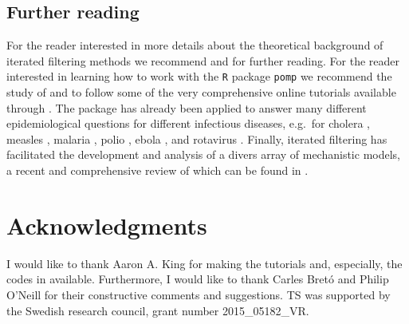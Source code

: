 \subsection{Further reading}
For the reader interested in more details about the theoretical background of iterated filtering methods we recommend  \cite{ionides06} and  \cite{Ionides2015} for further reading.  
For the reader interested in learning how to work with the \texttt{R} package \texttt{pomp} we recommend the study of  \cite{kingNgu} and to follow some of the very comprehensive online tutorials available through \cite{King2017}. The package  has already been applied to answer many different epidemiological questions for different infectious diseases, e.g.\ for cholera \citep{King2008},  measles \citep{He2010},    malaria \citep{bhadra}, polio \citep{martinezpolio}, ebola \citep{King2015}, and rotavirus \citep{martinez,Stocks2017}.
Finally, iterated filtering has facilitated the development and analysis of a divers array of mechanistic models, a recent and comprehensive review of which can be  found in  \cite{Breto2017}.
\section*{Acknowledgments}
I would like to thank Aaron A. King for making the tutorials and, especially, the codes in \cite{King2017} available. Furthermore, I would like to thank Carles Bret\'{o} and Philip O'Neill for their constructive comments and suggestions. TS was  supported by the Swedish research council, grant number 2015\_05182\_VR.